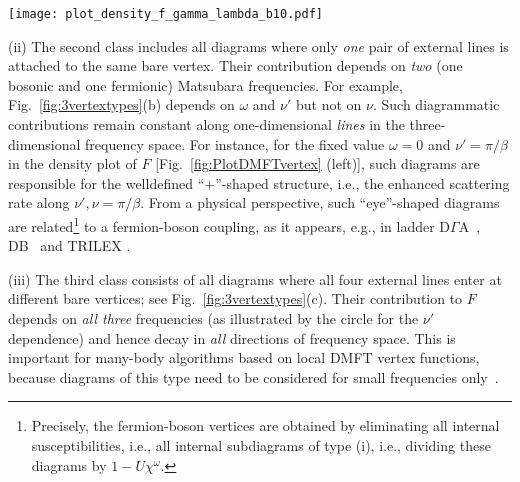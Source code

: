 \documentclass[rmp,aps,reprint,amsmath,amssymb,superscriptaddress,showpacs,nofootinbib]{revtex4-1}
\begin{document}
\begin{figure*}[tb]
\begin{minipage}{0.67\textwidth}
  \texttt{[image: plot\_density\_f\_gamma\_lambda\_b10.pdf]}
\end{minipage} \hfill
\begin{minipage}{0.28\textwidth}
    \caption{(Color online) DMFT results for the full local vertex ($F_c^{\nu\nu'(\omega=0)}$-U, left), the 2PI vertex in the $ph$ charge channel ($\Gamma_c^{\nu\nu'(\omega=0)}-U$, middle), and the fully 2PI vertex ($\Lambda_c^{\nu\nu'(\omega=0)}$-U, right) at Matsubara frequencies $\nu^{(\prime)}=(2n^{(\prime)}+1)\pi/\beta$. The calculations have been performed for the  Hubbard model on a square lattice with nearest-neighbor hopping $t$ at $T=0.4t$, $U=4.8t$ (lower panel) and $U= 5.08 t$ (upper panel). The intensity (color bar) is given in units of $4t$. Adapted from~.}
  \label{fig:PlotDMFTvertex}
\end{minipage}
\end{figure*}

(ii) The second class includes all diagrams where only {\sl one} pair of external lines is attached to the same bare vertex. Their contribution depends on {\sl two} (one bosonic and one fermionic) Matsubara frequencies. For example, Fig.~\ref{fig:3vertextypes}(b) depends on $\omega$ and $\nu'$ but not on $\nu$. Such diagrammatic contributions remain constant along one-dimensional {\sl lines} in the three-dimensional frequency space. For instance, for the fixed value $\omega=0$ and $\nu'=\pi/\beta$ in the density plot of $F$ [Fig.~\ref{fig:PlotDMFTvertex} (left)], such diagrams are responsible for the welldefined ``$+$''-shaped structure, i.e., the enhanced scattering rate along $\nu', \nu=\pi/\beta$. From a physical perspective, such ``eye''-shaped  diagrams are related\footnote{Precisely, the fermion-boson vertices are obtained by eliminating all internal susceptibilities, i.e., all internal subdiagrams of type (i), i.e., dividing these diagrams by $1-U\chi^{\omega}$\cite{Rohringer2016}.} to a fermion-boson coupling, as it  appears, e.g., in ladder D$\Gamma$A~\cite{Katanin2009,Rohringer2016}, DB~\cite{Rubtsov12,vanLoon2014a} and TRILEX \cite{Ayral2015,Ayral2016a}.


(iii) The third class consists of all diagrams where all four external lines enter at different bare vertices; see Fig.~\ref{fig:3vertextypes}(c). Their contribution to $F$ depends on {\sl all three} frequencies (as illustrated by the  circle for the $\nu'$ dependence) and hence decay in {\sl all} directions of frequency space. This is important for many-body algorithms based on local DMFT vertex functions, because diagrams of this type need to be considered for small frequencies only~\cite{Wentzell2016}. 
\end{document}
